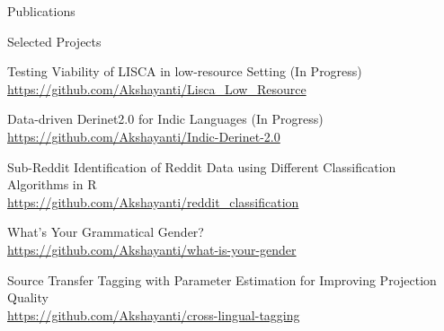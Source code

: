 \documentclass{resume} %
\begin{document}

\begin{rSection}{Publications}

    {}

    {}

    {}
    
    {}

    {}

\end{rSection}



\begin{rSection}{Selected Projects}

    {Testing Viability of LISCA in low-resource Setting (In Progress)}\\
        \url{https://github.com/Akshayanti/Lisca_Low_Resource}

    {Data-driven Derinet2.0 for Indic Languages (In Progress)}\\
        \url{https://github.com/Akshayanti/Indic-Derinet-2.0}

    {Sub-Reddit Identification of Reddit Data using Different Classification Algorithms in R}\\
        \url{https://github.com/Akshayanti/reddit_classification}

    {What's Your Grammatical Gender?}\\
        \url{https://github.com/Akshayanti/what-is-your-gender}

    {Source Transfer Tagging with Parameter Estimation for Improving Projection Quality}\\
        \url{https://github.com/Akshayanti/cross-lingual-tagging}

\end{rSection}


\end{document}
